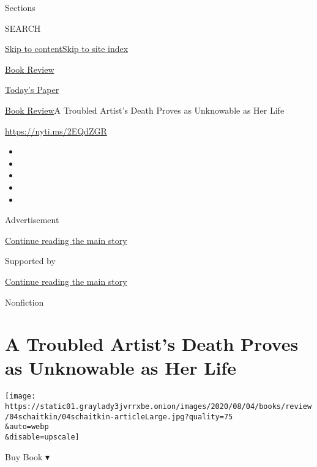 Sections

SEARCH

\protect\hyperlink{site-content}{Skip to
content}\protect\hyperlink{site-index}{Skip to site index}

\href{https://www.nytimes3xbfgragh.onion/section/books/review}{Book
Review}

\href{https://myaccount.nytimes3xbfgragh.onion/auth/login?response_type=cookie\&client_id=vi}{}

\href{https://www.nytimes3xbfgragh.onion/section/todayspaper}{Today's
Paper}

\href{/section/books/review}{Book Review}\textbar{}A Troubled Artist's
Death Proves as Unknowable as Her Life

\url{https://nyti.ms/2EQdZGR}

\begin{itemize}
\item
\item
\item
\item
\item
\end{itemize}

Advertisement

\protect\hyperlink{after-top}{Continue reading the main story}

Supported by

\protect\hyperlink{after-sponsor}{Continue reading the main story}

Nonfiction

\hypertarget{a-troubled-artists-death-proves-as-unknowable-as-her-life}{%
\section{A Troubled Artist's Death Proves as Unknowable as Her
Life}\label{a-troubled-artists-death-proves-as-unknowable-as-her-life}}

\texttt{[image: https://static01.graylady3jvrrxbe.onion/images/2020/08/04/books/review/04schaitkin/04schaitkin-articleLarge.jpg?quality=75\\\&auto=webp\\\&disable=upscale]}

Buy Book ▾

